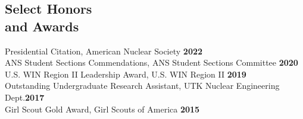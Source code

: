 \documentclass[margin,line]{resume}
\begin{document}
\begin{resume}
    \section{\mysidestyle Select Honors \\and Awards}
    Presidential Citation, American Nuclear Society \hfill \textbf{2022}\vspace{.5mm}\\
    ANS Student Sections Commendations, ANS Student Sections Committee \hfill \textbf{2020}\vspace{.5mm}\\%
    U.S. WIN Region II Leadership Award, U.S. WIN Region II \hfill \textbf{2019}\vspace{.5mm}\\%
    Outstanding Undergraduate Research Assistant, UTK Nuclear Engineering Dept.\hfill \textbf{2017}\vspace{.5mm}\\
    Girl Scout Gold Award, Girl Scouts of America \hfill \textbf{2015}\vspace{.5mm}\\%
    \vspace{-7mm}


\end{resume}
\end{document}
